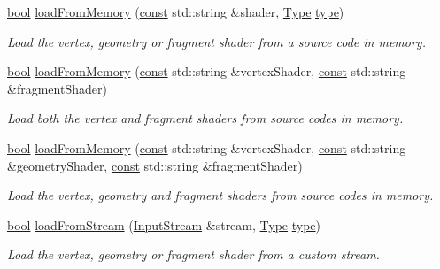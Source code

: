 \begin{DoxyCompactItemize}
\hyperlink{term__entry_8h_a002004ba5d663f149f6c38064926abac}{bool} \hyperlink{classsf_1_1_shader_ac92d46bf71dff2d791117e4e472148aa}{load\-From\-Memory} (\hyperlink{term__entry_8h_a57bd63ce7f9a353488880e3de6692d5a}{const} std\-::string \&shader, \hyperlink{classsf_1_1_shader_afaa1aa65e5de37b74d047da9def9f9b3}{Type} \hyperlink{_entity_8cpp_aa209819775142a76b8e49319d79ecab2}{type})
\begin{DoxyCompactList}\small\item\em Load the vertex, geometry or fragment shader from a source code in memory. \end{DoxyCompactList}\item 
\hyperlink{term__entry_8h_a002004ba5d663f149f6c38064926abac}{bool} \hyperlink{classsf_1_1_shader_ae34e94070d7547a890166b7993658a9b}{load\-From\-Memory} (\hyperlink{term__entry_8h_a57bd63ce7f9a353488880e3de6692d5a}{const} std\-::string \&vertex\-Shader, \hyperlink{term__entry_8h_a57bd63ce7f9a353488880e3de6692d5a}{const} std\-::string \&fragment\-Shader)
\begin{DoxyCompactList}\small\item\em Load both the vertex and fragment shaders from source codes in memory. \end{DoxyCompactList}\item 
\hyperlink{term__entry_8h_a002004ba5d663f149f6c38064926abac}{bool} \hyperlink{classsf_1_1_shader_ab8c8b715b02aba2cf7c0a0e0c0984250}{load\-From\-Memory} (\hyperlink{term__entry_8h_a57bd63ce7f9a353488880e3de6692d5a}{const} std\-::string \&vertex\-Shader, \hyperlink{term__entry_8h_a57bd63ce7f9a353488880e3de6692d5a}{const} std\-::string \&geometry\-Shader, \hyperlink{term__entry_8h_a57bd63ce7f9a353488880e3de6692d5a}{const} std\-::string \&fragment\-Shader)
\begin{DoxyCompactList}\small\item\em Load the vertex, geometry and fragment shaders from source codes in memory. \end{DoxyCompactList}\item 
\hyperlink{term__entry_8h_a002004ba5d663f149f6c38064926abac}{bool} \hyperlink{classsf_1_1_shader_a2ee1b130c0606e4f8bcdf65c1efc2a53}{load\-From\-Stream} (\hyperlink{classsf_1_1_input_stream}{Input\-Stream} \&stream, \hyperlink{classsf_1_1_shader_afaa1aa65e5de37b74d047da9def9f9b3}{Type} \hyperlink{_entity_8cpp_aa209819775142a76b8e49319d79ecab2}{type})
\begin{DoxyCompactList}\small\item\em Load the vertex, geometry or fragment shader from a custom stream. \end{DoxyCompactList}\item 

\end{DoxyCompactItemize}
